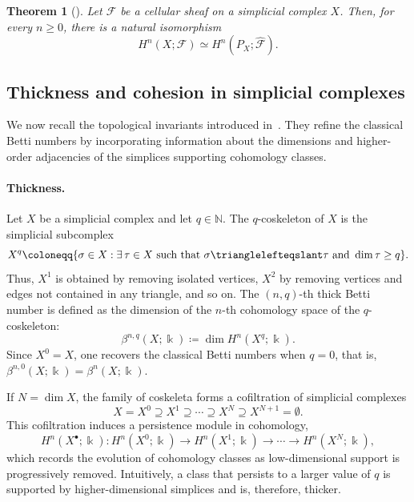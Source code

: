 \documentclass[reqno,12pt]{amsart}
\newcommand{\face}{{\trianglelefteqslant}}
\newcommand{\cF}{{\mathcal F}}
\newcommand{\bbN}{{\mathbb N}}
\newcommand{\0}{\mathbf 0}
\newtheorem{theorem}{Theorem}[section]
\theoremstyle{definition}
\begin{document}
\begin{theorem}[{\!\!\cite[Theorem~1.4.2]{Shepard85}}] \label{Thm:EquivalenciaCohomologiacelularyhaces}
    Let $\cF$ be a cellular sheaf on a simplicial complex $X$. Then, for every $n\geq 0$, there is a natural isomorphism
    \[
        H^n(X;\cF) \simeq H^n(P_X;\widehat{\cF}).
    \]
\end{theorem}



\subsection{Thickness and cohesion in simplicial complexes}
\label{s:pre1}

We now recall the topological invariants introduced in~\cite{Pablo_Dani_Dario_25}. They refine the classical Betti numbers by incorporating information about the dimensions and higher-order adjacencies of the simplices supporting cohomology classes.

\paragraph{{\bf Thickness.}}
Let $X$ be a simplicial complex and let $q\in\bbN$. The $q$-coskeleton of $X$ is the simplicial subcomplex
\[
    X^q \coloneqq \{\sigma\in X : \exists\,\tau\in X \text{ such that } \sigma\face\tau \text{ and }\dim\tau\geq q\}.
\]
Thus, $X^1$ is obtained by removing isolated vertices, $X^2$ by removing vertices and edges not contained in any triangle, and so on. The $(n,q)$-th thick Betti number is defined as the dimension of the $n$-th cohomology space of the $q$-coskeleton:
\[
    \beta^{n,q}(X;\Bbbk) \coloneqq \dim H^n(X^q;\Bbbk).
\]
Since $X^0=X$, one recovers the classical Betti numbers when $q=0$, that is, $\beta^{n,0}(X;\Bbbk)=\beta^n(X;\Bbbk)$. 

If $N=\dim X$, the family of coskeleta forms a cofiltration of simplicial complexes
\[
    X=X^0\supseteq X^1\supseteq\cdots\supseteq X^N\supseteq X^{N+1}=\emptyset.
\]
This cofiltration induces a persistence module in cohomology,
\[
    H^n(X^\bullet;\Bbbk)\colon H^n(X^0;\Bbbk) \longrightarrow H^n(X^1;\Bbbk) \longrightarrow \cdots \longrightarrow H^n(X^N;\Bbbk),
\]
which records the evolution of cohomology classes as low-dimensional support is progressively removed. Intuitively, a class that persists to a larger value of $q$ is supported by higher-dimensional simplices and is, therefore, thicker.
\end{document}
